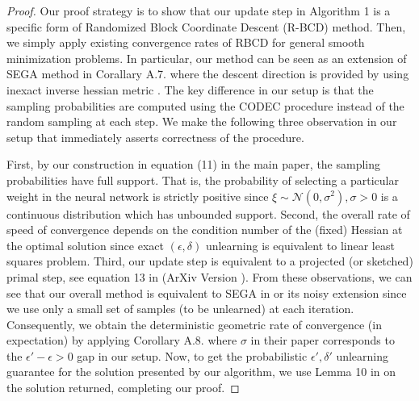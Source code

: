 \begin{proof}
Our proof strategy is to show that our update step in Algorithm 1 is a specific form of Randomized Block Coordinate Descent (R-BCD) method. Then, we simply apply existing convergence rates of RBCD for general smooth minimization problems.  In particular, our method can be seen as an extension of SEGA method in Corallary A.7. \cite{gorbunov2020unified} where the descent direction is provided by using inexact inverse hessian metric \cite{loizou2020convergence}.  The key difference in our setup is that the sampling probabilities are computed using the CODEC procedure instead of the random sampling at each step. We make the following three observation in our setup  that immediately asserts correctness of the procedure. 

First, by our construction in equation (11) in the main paper, the sampling probabilities have full support. That is, the probability of selecting a particular weight in the neural network is strictly positive since $\xi\sim\mathcal{N}(0,\sigma^2), \sigma>0$ is a continuous distribution which has unbounded support. Second, the overall rate of speed of convergence depends on the condition number of the (fixed) Hessian at the optimal solution since exact $(\epsilon,\delta)$ unlearning is equivalent to linear least squares problem. Third, our update step is equivalent to a projected (or sketched) primal step, see equation 13 in (ArXiv Version \cite{loizou2019convergenceArxiv}). From these observations, we can see that our overall method is equivalent to SEGA in \cite{gorbunov2020unified} or its noisy extension since we use only a small set of samples (to be unlearned) at each iteration. Consequently, we obtain the deterministic geometric rate of convergence (in expectation)  by applying Corollary A.8. where $\sigma$ in their paper corresponds to the $\epsilon'-\epsilon>0$ gap in our setup. Now, to get the probabilistic $\epsilon',\delta'$ unlearning guarantee for the solution presented by our algorithm, we use Lemma 10 in \cite{sekhari2021remember} on the solution returned, completing our proof.
\end{proof}
